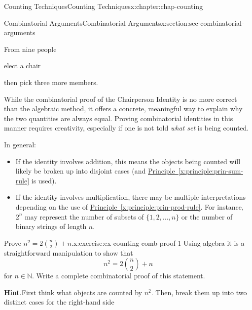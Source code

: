 \documentclass[oneside,10pt,]{book}
\newcommand{\blocktitlefont}{\relax}
\newcommand{\xreffont}{\relax}
\numberwithin{equation}{section}
\begin{document}
\begin{chapterptx}{Counting Techniques}{}{Counting Techniques}{}{}{x:chapter:chap-counting}
\begin{sectionptx}{Combinatorial Arguments}{}{Combinatorial Arguments}{}{}{x:section:sec-combinatorial-arguments}
\begin{sidebyside}{3}{0.085}{0.085}{0.17}
\end{sidebyside}%
\begin{sidebyside}{3}{0.085}{0.085}{0.17}%
\begin{sbspanel}{0.15}%
From nine people%
\end{sbspanel}%
\begin{sbspanel}{0.17}%
\par
elect a chair%
\end{sbspanel}%
\begin{sbspanel}{0.17}%
\par
then pick three more members.%
\end{sbspanel}%
\end{sidebyside}%
\par
While the combinatorial proof of the Chairperson Identity is no more correct than the algebraic method, it offers a concrete, meaningful way to explain why the two quantities are always equal. Proving combinatorial identities in this manner requires creativity, especially if one is not told \emph{what set} is being counted.%
\par
In general:%
\begin{itemize}[label=\textbullet]
\item{}If the identity involves addition, this means the objects being counted will likely be broken up into disjoint cases (and \hyperref[x:principle:prin-sum-rule]{Principle~{\xreffont\ref{x:principle:prin-sum-rule}}} is used).%
\item{}If the identity involves multiplication, there may be multiple interpretations depending on the use of \hyperref[x:principle:prin-prod-rule]{Principle~{\xreffont\ref{x:principle:prin-prod-rule}}}. For instance, \(2^n\) may represent the number of subsets of \(\{1,2,\ldots,n\}\) or the number of binary strings of length \(n\).%
\end{itemize}
%
\begin{inlineexercise}{Prove \(n^2 = 2\binom{n}{2} + n\).}{x:exercise:ex-counting-comb-proof-1}%
Using algebra it is a straightforward manipulation to show that%
\begin{equation*}
n^2 = 2\binom{n}{2} + n
\end{equation*}
for \(n \in \mathbb{N}\). Write a complete combinatorial proof of this statement.%
\par\smallskip%
\noindent\textbf{\blocktitlefont Hint}.\hypertarget{g:hint:id477696}{}\quad{}First think what objects are counted by \(n^2\). Then, break them up into two distinct cases for the right-hand side%
\end{inlineexercise}

\end{sectionptx}
\end{chapterptx}
\end{document}
